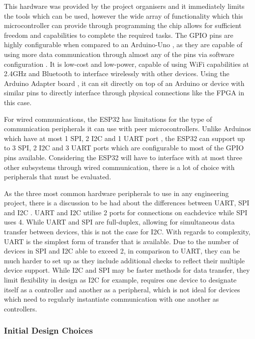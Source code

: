 \documentclass[a4paper]{article}
\begin{document}
This hardware was provided by the project organisers and it immediately 
limits the tools which can be used, however the wide array of functionality 
which this microcontroller can provide through programming the chip allows
for sufficient freedom and capabilities to complete the required tasks. The
GPIO pins are highly configurable when compared to an Arduino-Uno 
\cite{MicrocontrollerComparison}, as they are capable of using more data 
communication through almost any of the pins via software configuration 
\cite{ESP32PinOut}. It is low-cost and low-power, capable of using 
WiFi capabilities at 2.4GHz and Bluetooth \cite{ESP32Datasheet} to 
interface wirelessly with other devices. Using the Arduino Adapter 
board \cite{ESP32ArduinoAdapter}, it can sit directly on top of an 
Arduino or device with similar pins to directly interface through 
physical connections like the FPGA in this case. 

For wired communications, the ESP32 has limitations for the type of 
communication peripherals it can use with peer microcontrollers. 
Unlike Arduinos which have at most 1 SPI, 2 I2C and 1 UART port 
\cite{ArduinoPeripheral}, the ESP32 can support up to 3 SPI, 2 I2C and 
3 UART ports \cite{ESP32Datasheet} which are configurable to most of 
the GPIO pins available. Considering the ESP32 will have to interface with 
at most three other subsystems through wired communication, 
there is a lot of choice with peripherals that must be evaluated.

As the three most common hardware peripherals to use in any engineering
project, there is a discussion to be had about the differences between
UART, SPI and I2C \cite{CommProtocolComp}. UART and I2C utilise 2 ports 
for connections on eachdevice while SPI uses 4. While UART and SPI 
are full-duplex, allowing for simultaneous data transfer between devices, 
this is not the case for I2C. With regards to complexity, UART is the 
simplest form of transfer that is available. Due to the number of 
devices in SPI and I2C able to exceed 2, in comparison to UART, they 
can be much harder to set up as they include additional checks to reflect
their multiple device support. While I2C and SPI may be faster methods for 
data transfer, they limit flexibility in design as I2C for example, 
requires one device to designate itself as a controller and another as a 
peripheral, which is not ideal for devices which need to regularly 
instantiate communication with one another as controllers.

\subsubsection{Initial Design Choices} 
\end{document}
